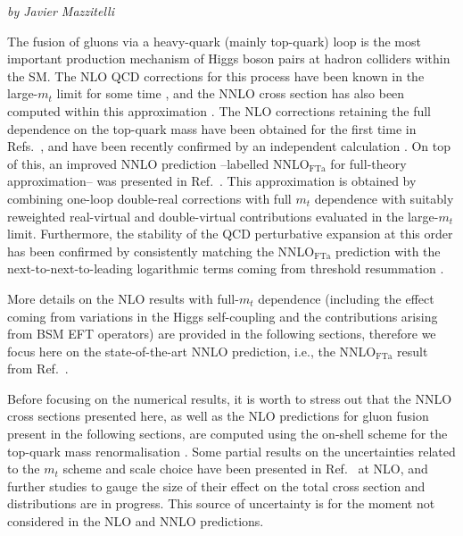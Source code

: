 \label{sec:HH_NNLO}
\begin{center}
    \textit{by Javier Mazzitelli}
\end{center}

The fusion of gluons via a heavy-quark (mainly top-quark) loop is the most important production mechanism of Higgs boson pairs at hadron colliders within the SM.
The NLO QCD corrections for this process have been known in the large-$m_t$ limit for some time \cite{Dawson:1998py}, and the NNLO cross section has also been computed within this approximation \cite{deFlorian:2013jea}.
The NLO corrections retaining the full dependence on the top-quark mass have been obtained for the first time in Refs.~\cite{Borowka:2016ehy,Borowka:2016ypz}, and have been recently confirmed by an independent calculation \cite{Baglio:2018lrj}.
On top of this, an improved NNLO prediction --labelled NNLO$_{\mathrm{FTa}}$ for full-theory approximation-- was presented in Ref.~\cite{Grazzini:2018bsd}.
This approximation is obtained by combining one-loop double-real corrections with full $m_t$ dependence with suitably reweighted real-virtual and double-virtual contributions evaluated in the large-$m_t$ limit.
Furthermore, the stability of the QCD perturbative expansion at this order has been confirmed by consistently matching the NNLO$_{\mathrm{FTa}}$ prediction with the next-to-next-to-leading logarithmic terms coming from threshold resummation \cite{deFlorian:2018tah}.

More details on the NLO results with full-$m_t$ dependence (including the effect coming from variations in the Higgs self-coupling and the contributions arising from BSM EFT operators) are provided in the following sections, therefore we focus here on the state-of-the-art NNLO prediction, i.e., the NNLO$_{\mathrm{FTa}}$ result from Ref.~\cite{Grazzini:2018bsd}.

Before focusing on the numerical results, it is worth to stress out that the NNLO cross sections presented here, as well as the NLO predictions for gluon fusion present in the following sections, are computed using the on-shell scheme for the top-quark mass renormalisation .
Some partial results on the uncertainties related to the $m_t$ scheme and scale choice have been presented in Ref.~\cite{Baglio:2018lrj} at NLO, and further studies to gauge the size of their effect on the total cross section and distributions are in progress.
This source of uncertainty is for the moment not considered in the NLO and NNLO predictions.

